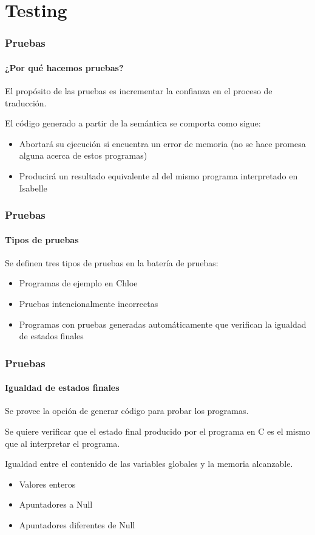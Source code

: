 \section{Testing}

\begin{frame}
\frametitle{Pruebas}
\framesubtitle{¿Por qué hacemos pruebas?}

El propósito de las pruebas es incrementar la confianza en el proceso de traducción.

\bigskip

El código generado a partir de la semántica se comporta como sigue:
\begin{itemize}
\item{Abortará su ejecución si encuentra un error de memoria (no se hace promesa alguna acerca de estos programas)}
\item{Producirá un resultado equivalente al del mismo programa interpretado en Isabelle}
\end{itemize}


\end{frame}


\begin{frame}
\frametitle{Pruebas}
\framesubtitle{Tipos de pruebas}

Se definen tres tipos de pruebas en la batería de pruebas:

\begin{itemize}
\item{Programas de ejemplo en Chloe}
\item{Pruebas intencionalmente incorrectas}
\item{Programas con pruebas generadas automáticamente que verifican la igualdad de estados finales}
\end{itemize}


\end{frame}


\begin{frame}
\frametitle{Pruebas}
\framesubtitle{Igualdad de estados finales}

Se provee la opción de generar código para probar los programas.

Se quiere verificar que el estado final producido por el programa en C es el mismo que al interpretar el programa.

\begin{block}{Igualdad entre el contenido de las variables globales y la memoria alcanzable.}
\begin{itemize}
\item{Valores enteros}
\item{Apuntadores a Null}
\item{Apuntadores diferentes de Null}
\end{itemize}
\end{block}


\end{frame}


